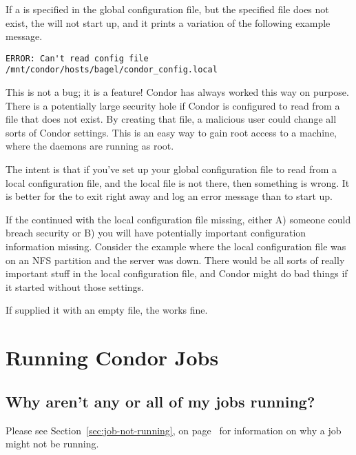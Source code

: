 If a  
is specified in the global configuration file,
but the specified file does not exist,
the  will not start up, and it prints a variation
of the following example message.

\footnotesize
\begin{verbatim}
ERROR: Can't read config file /mnt/condor/hosts/bagel/condor_config.local
\end{verbatim}
\normalsize

This is not a bug; it is a feature!
Condor has always worked this way on purpose.
There is a potentially
large security hole if Condor is configured to read from a file that
does not exist.
By creating that file, a malicious user could
change all sorts of Condor settings.
This is an easy way
to gain root access to a machine,
where the daemons are running as root.

The intent is that
if you've set up your global configuration file to read
from a local configuration file, and the local file is not there,
then something is wrong.
It is better for the  to exit right away and
log an error message than to start up.

If the  continued with the local configuration file
missing, either A) someone could breach security or B) you will have
potentially important configuration information missing.
Consider the example where the local configuration file was on an NFS
partition and the server was down. 
There would be all sorts of
really important stuff in the local configuration file,
and Condor might do bad things if it started without those settings.  

If supplied it with an empty file, the  works fine.



\section{Running Condor Jobs}

\subsection*{Why aren't any or all of my jobs running?}

Please see 
Section~\ref{sec:job-not-running}, on page~\pageref{sec:job-not-running}
for information on why a job might not be running.


